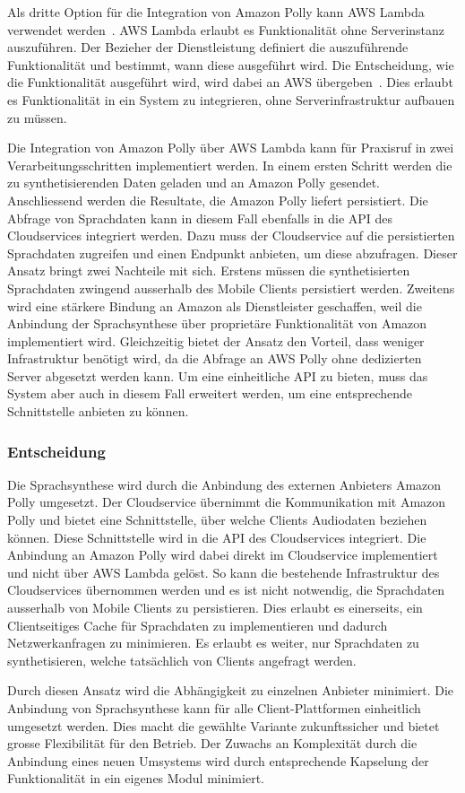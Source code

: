Als dritte Option für die Integration von Amazon Polly kann AWS Lambda verwendet werden~\cite{aws_polly}.
AWS Lambda erlaubt es Funktionalität ohne Serverinstanz auszuführen.
Der Bezieher der Dienstleistung definiert die auszuführende Funktionalität und bestimmt, wann diese ausgeführt wird.
Die Entscheidung, wie die Funktionalität ausgeführt wird, wird dabei an AWS übergeben~\cite{aws_lambda}.
Dies erlaubt es Funktionalität in ein System zu integrieren, ohne Serverinfrastruktur aufbauen zu müssen.

Die Integration von Amazon Polly über AWS Lambda kann für Praxisruf in zwei Verarbeitungsschritten implementiert werden.
In einem ersten Schritt werden die zu synthetisierenden Daten geladen und an Amazon Polly gesendet.
Anschliessend werden die Resultate, die Amazon Polly liefert persistiert.
Die Abfrage von Sprachdaten kann in diesem Fall ebenfalls in die API des Cloudservices integriert werden.
Dazu muss der Cloudservice auf die persistierten Sprachdaten zugreifen und einen Endpunkt anbieten, um diese abzufragen.
Dieser Ansatz bringt zwei Nachteile mit sich.
Erstens müssen die synthetisierten Sprachdaten zwingend ausserhalb des Mobile Clients persistiert werden.
Zweitens wird eine stärkere Bindung an Amazon als Dienstleister geschaffen, weil die Anbindung der Sprachsynthese über proprietäre Funktionalität von Amazon implementiert wird.
Gleichzeitig bietet der Ansatz den Vorteil, dass weniger Infrastruktur benötigt wird, da die Abfrage an AWS Polly ohne dedizierten Server abgesetzt werden kann.
Um eine einheitliche API zu bieten, muss das System aber auch in diesem Fall erweitert werden, um eine entsprechende Schnittstelle anbieten zu können.

\subsubsection{Entscheidung}

Die Sprachsynthese wird durch die Anbindung des externen Anbieters Amazon Polly umgesetzt.
Der Cloudservice übernimmt die Kommunikation mit Amazon Polly und bietet eine Schnittstelle, über welche Clients Audiodaten beziehen können.
Diese Schnittstelle wird in die API des Cloudservices integriert.
Die Anbindung an Amazon Polly wird dabei direkt im Cloudservice implementiert und nicht über AWS Lambda gelöst.
So kann die bestehende Infrastruktur des Cloudservices übernommen werden und es ist nicht notwendig, die Sprachdaten ausserhalb von Mobile Clients zu persistieren.
Dies erlaubt es einerseits, ein Clientseitiges Cache für Sprachdaten zu implementieren und dadurch Netzwerkanfragen zu minimieren.
Es erlaubt es weiter, nur Sprachdaten zu synthetisieren, welche tatsächlich von Clients angefragt werden.

Durch diesen Ansatz wird die Abhängigkeit zu einzelnen Anbieter minimiert.
Die Anbindung von Sprachsynthese kann für alle Client-Plattformen einheitlich umgesetzt werden.
Dies macht die gewählte Variante zukunftssicher und bietet grosse Flexibilität für den Betrieb.
Der Zuwachs an Komplexität durch die Anbindung eines neuen Umsystems wird durch entsprechende Kapselung der Funktionalität in ein eigenes Modul minimiert.

\clearpage
